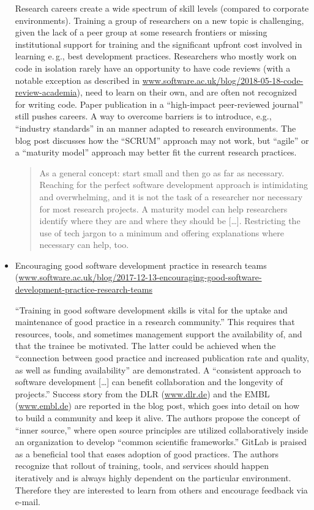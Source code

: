 \documentclass[11pt,letterpaper]{article}
\begin{document}
\begin{itemize}
\noindent Research careers create a wide spectrum of skill levels (compared to corporate environments). Training a group of researchers on a new topic is challenging, given the lack of a peer group at some research frontiers or missing institutional support for training and the significant upfront cost involved in learning e.\,g., best development practices. Researchers who mostly work on code in isolation rarely have an opportunity to have code reviews (with a notable exception as described in \href{https://www.software.ac.uk/blog/2018-05-18-code-review-academia}{www.software.ac.uk/blog/2018-05-18-code-review-academia}), need to learn on their own, and are often not recognized for writing code. Paper publication in a ``high-impact peer-reviewed journal'' still pushes careers. A way to overcome barriers is to introduce, e.g., ``industry standards'' in an manner adapted to research environments. The blog post discusses how the ``SCRUM'' approach may not work, but ``agile'' or a ``maturity model'' approach may better fit the current research practices.
\begin{quote}
As a general concept: start small and then go as far as necessary. Reaching for the perfect software development approach is intimidating and overwhelming, and it is not the task of a researcher nor necessary for most research projects. A maturity model can help researchers identify where they are and where they should be [\ldots]. Restricting the use of tech jargon to a minimum and offering explanations where necessary can help, too.
\end{quote}


\item Encouraging good software development practice in research teams (\href{https://www.software.ac.uk/blog/2017-12-13-encouraging-good-software-development-practice-research-teams}{www.software.ac.uk/blog/2017-12-13-encouraging-good-software-development-practice-research-teams}

\noindent ``Training in good software development skills is vital for the uptake and maintenance of good practice in a research community.'' This requires that resources, tools, and sometimes management support the availability of, and that the trainee be motivated. The latter could be achieved when the ``connection between good practice and increased publication rate and quality, as well as funding availability'' are demonstrated. A ``consistent approach to software development [\ldots] can benefit collaboration and the longevity of projects.'' Success story from the DLR (\href{https://www.dlr.de}{www.dlr.de}) and the EMBL (\href{https://www.embl.de/}{www.embl.de}) are reported in the blog post, which goes into detail on how to build a community and keep it alive. The authors propose the concept of ``inner source,'' where open source principles are utilized collaboratively inside an organization to develop ``common scientific frameworks.'' GitLab is praised as a beneficial tool that eases adoption of good practices. The authors recognize that rollout of training, tools, and services should happen iteratively and is always highly dependent on the particular environment. Therefore they are interested to learn from others and encourage feedback via e-mail.


\end{itemize}
\end{document}
